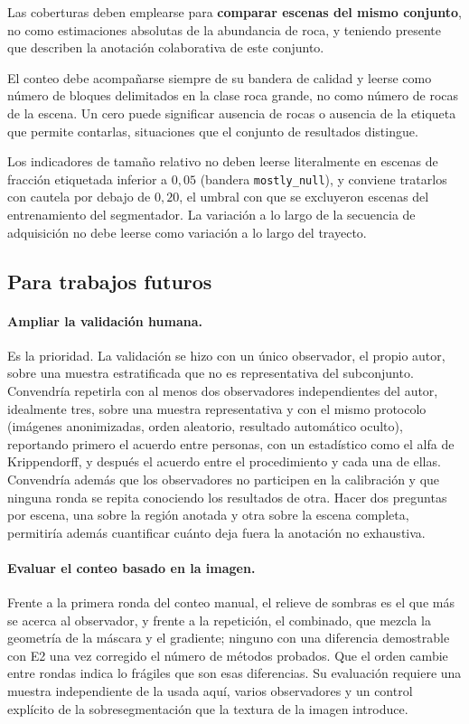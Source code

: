Las coberturas deben emplearse para \textbf{comparar escenas del mismo conjunto}, no como
estimaciones absolutas de la abundancia de roca, y teniendo presente que describen la anotación
colaborativa de este conjunto.

El conteo debe acompañarse siempre de su bandera de calidad y leerse como número de bloques
delimitados en la clase roca grande, no como número de rocas de la escena. Un cero puede
significar ausencia de rocas o ausencia de la etiqueta que permite contarlas, situaciones que el
conjunto de resultados distingue.

Los indicadores de tamaño relativo no deben leerse literalmente en escenas de fracción
etiquetada inferior a $0{,}05$ (bandera \texttt{mostly\_null}), y conviene tratarlos con
cautela por debajo de $0{,}20$, el umbral con que se excluyeron escenas del entrenamiento del
segmentador. La variación a lo largo de la secuencia de adquisición no debe leerse
como variación a lo largo del trayecto.

\subsection{Para trabajos futuros}

\paragraph{Ampliar la validación humana.} Es la prioridad. La validación se hizo con un único
observador, el propio autor, sobre una muestra estratificada que no es representativa del
subconjunto. Convendría repetirla con al menos dos observadores independientes del autor,
idealmente tres, sobre una muestra representativa y con el mismo protocolo (imágenes
anonimizadas, orden aleatorio, resultado automático oculto), reportando primero el acuerdo
entre personas, con un estadístico como el alfa de Krippendorff, y después el acuerdo entre el
procedimiento y cada una de ellas. Convendría además que los observadores no participen en la
calibración y que ninguna ronda se repita conociendo los resultados de otra. Hacer dos preguntas por escena, una sobre la región anotada y
otra sobre la escena completa, permitiría además cuantificar cuánto deja fuera la anotación no
exhaustiva.

\paragraph{Evaluar el conteo basado en la imagen.} Frente a la primera ronda del conteo manual,
el relieve de sombras es el que más se acerca al observador, y frente a la repetición, el
combinado, que mezcla la geometría de la máscara y el gradiente; ninguno con una diferencia
demostrable con E2 una vez corregido el número de métodos probados. Que el orden cambie entre
rondas indica lo frágiles que son esas diferencias. Su evaluación requiere una
muestra independiente de la usada aquí, varios observadores y un control explícito de la
sobresegmentación que la textura de la imagen introduce.

